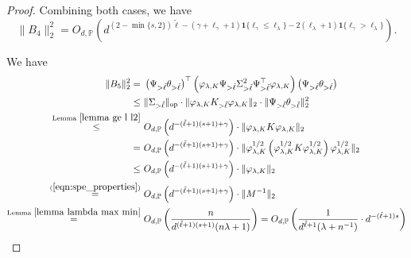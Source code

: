 \documentclass{article}
\theoremstyle{plain}
\theoremstyle{definition}
\theoremstyle{remark}
\begin{document}
\begin{appendix}
\begin{proof}
\bigskip 

Combining both cases, we have
\begin{equation}\label{eqn_bound_B_4_spe}
    \|B_4\|_{2}^{2} = O_{d, \mathbb{P}} \left(  d^{(2-\min\{s, 2\})\tilde{\ell} - (\gamma  + \ell_{\gamma} + 1)\mathbf{1}\{\ell_{\gamma} \leq \ell_{\lambda}\} - 2(\ell_{\lambda}+1)\mathbf{1}\{\ell_{\gamma} > \ell_{\lambda}\} } \right).
\end{equation}





\newpage


We have
\begin{equation}\label{eqn_bound_B_5_spe}
    \begin{aligned}
\|B_5\|_{2}^{2} 
        =&~
        \left( \Psi_{>\tilde{\ell}} \theta_{>\tilde{\ell}}  \right)^{\top} 
        \left( \varphi_{\lambda, K}   \Psi_{>\tilde{\ell}} \Sigma_{>\tilde{\ell}}^2 \Psi_{>\tilde{\ell}}^{\top} \varphi_{\lambda, K} \right) 
        \left( \Psi_{>\tilde{\ell}} \theta_{>\tilde{\ell}}  \right)\\
        \leq &~
        \|\Sigma_{> \tilde{\ell}}\|_{\mathrm{op}} \cdot \|\varphi_{\lambda, K} K_{> \tilde{\ell}}  \varphi_{\lambda, K}\|_{2} \cdot \|\Psi_{>\tilde{\ell}} \theta_{>\tilde{\ell}}\|_{2}^{2}\\
        \overset{\text{Lemma } \ref{lemma ge l l2}}{\leq}&~
         O_{d, \mathbb{P}} \left(  d^{-(\tilde{\ell}+1)(s+1) + \gamma} \right) \cdot \|\varphi_{\lambda, K} K  \varphi_{\lambda, K}\|_{2}\\
         =&~
         O_{d, \mathbb{P}} \left(  d^{-(\tilde{\ell}+1)(s+1) + \gamma} \right) \cdot \|\varphi_{\lambda, K}^{1/2} \left(\varphi_{\lambda, K}^{1/2} K \varphi_{\lambda, K}^{1/2}\right)  \varphi_{\lambda, K}^{1/2}\|_{2}\\
         \leq &~
         O_{d, \mathbb{P}} \left(  d^{-(\tilde{\ell}+1)(s+1) + \gamma} \right) \cdot \|\varphi_{\lambda, K}\|_{2}\\
         \overset{(\ref{eqn:spe_properties})}{=} &~
         O_{d, \mathbb{P}} \left(  d^{-(\tilde{\ell}+1)(s+1) + \gamma} \right) \cdot \|M^{-1}\|_{2}\\
         \overset{\text{Lemma } \ref{lemma lambda max min}}{=}&~
         O_{d, \mathbb{P}}\left( \frac{n }{d^{(\tilde{\ell}+1)(s+1)} (n\lambda+1)}\right) = O_{d, \mathbb{P}}\left( \frac{1}{d^{\tilde{\ell}+1}(\lambda +n^{-1})}\cdot d^{-(\tilde{\ell}+1)s} \right)\\

\end{aligned}
\end{equation}
\end{proof}
\end{appendix}
\end{document}
